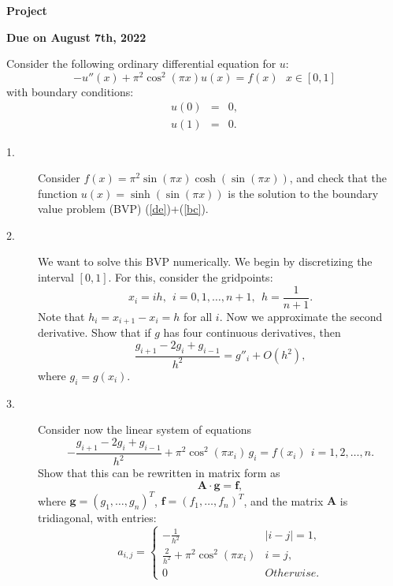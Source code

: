 \documentclass[12pt]{article}
\begin{document}
\thispagestyle{plain}
\begin{center}
{\Large \bf Project}

\medskip
{\bf Due on August 7th, 2022}
\end{center}
\noindent
Consider the following ordinary
differential equation for $u$:
\begin{equation}
\label{de}
-u''(x)+\pi^2 \cos^2(\pi x) u(x) = f(x)\ \ \ x \in [0,1]
\end{equation}
with boundary conditions:
\begin{eqnarray}
\label{bc}
u(0) &=& 0, \nonumber \\
u(1) &=& 0.
\end{eqnarray}
\begin{description}
\item[1.] Consider
$f(x) = \pi^2 \sin(\pi x) \cosh(\sin (\pi x) )$,
and check that the function $u(x) = \sinh ( \sin (\pi x) )$ is the
solution to the
boundary value problem (BVP) (\ref{de})+(\ref{bc}).
\item[2.] We want to solve this BVP
numerically. We begin by
discretizing the interval $[0,1]$. For this, consider the gridpoints:
\begin{equation}
x_i = i h,\ \ i=0,1,\dots,n+1,\  \ h=\frac{1}{n+1}.
\end{equation}
Note that $h_i = x_{i+1}-x_i = h$ for all $i$.  Now we approximate the
second derivative. Show that if $g$ has four
continuous derivatives, then
\begin{equation}
\label{approx}
\frac{g_{i+1}-2g_i+g_{i-1}}{h^2} = g''_i + O(h^2),
\end{equation}
where $g_i = g(x_i)$.
\item[3.] Consider now the linear system of equations
\begin{equation}
\label{system}
- \frac{g_{i+1}-2g_i+g_{i-1}}{h^2}+\pi^2 \cos^2 (\pi x_i )\, g_i = f(x_i)\
\ i=1,2,\dots,n.
\end{equation}
Show that this can be rewritten in matrix form as
\[
\bm{ A} \cdot \bm{ g} = \bm{ f},
\]
where $\bm{ g} = (g_1,\dots,g_{n})^T$,
$\bm{ f} = (f_1,\dots,f_{n})^T$, and the matrix $\bm{ A}$ is
tridiagonal, with entries:
\begin{equation}
a_{i,j} = \left \lbrace \begin{array}{cr} -\frac{1}{h^2}& |i-j|=1, \\
	\frac{2}{h^2} + \pi^2 \cos^2(\pi x_i) & i=j, \\
0& Otherwise. \end{array}
\right .
\end{equation}

\end{description}
\end{document}
